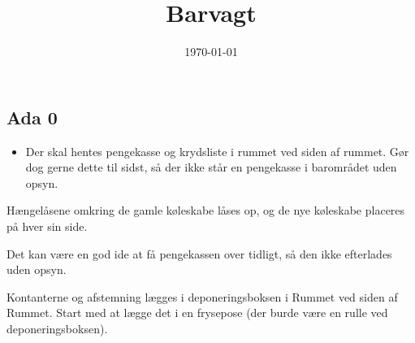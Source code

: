 

\title{Barvagt}
\date{\today}



\maketitle

\tableofcontents

\vspace{0.4cm}


\subsection{Ada 0}
\label{sec:pre:ada}

\begin{itemize}
\item Der skal hentes pengekasse og krydsliste i rummet ved siden af
  rummet. Gør dog gerne dette til sidst, så der ikke står en
  pengekasse i barområdet uden opsyn.
\end{itemize}
\item Hængelåsene omkring de gamle køleskabe låses op, og de nye køleskabe placeres på hver sin side.

Det kan være en god ide at få
pengekassen over tidligt, så den ikke efterlades uden opsyn.

Kontanterne og afstemning lægges i deponeringsboksen i Rummet ved
siden af Rummet. Start med at lægge det i en frysepose (der burde være
en rulle ved deponeringsboksen).



